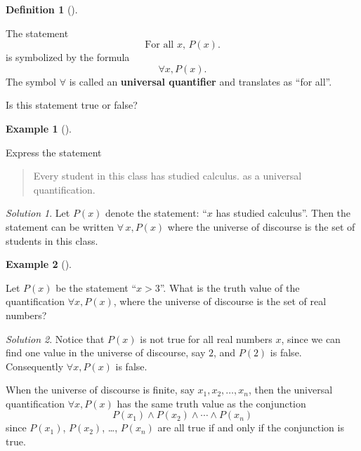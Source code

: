 \documentclass[
  letterpaper,
  10pt,
  reqno,
  twopage,
  openany]{book}
\theoremstyle{plain}
\theoremstyle{definition}
\theoremstyle{definition}
\newtheorem{definition}{Definition}[chapter]
\theoremstyle{definition}
\newtheorem{example}{Example}[chapter]
\theoremstyle{plain}
\theoremstyle{plain}
\theoremstyle{remark}
\newtheorem*{solution}{Solution}
\begin{document}
\leavevmode{}%
\begin{definition}[]\label{def-universal-quantifier}

\label{uqdef} The statement \[
\text{For all $x$, $P(x)$.}
\] is symbolized by the formula \[
\forall x, P(x).
\] The symbol \(\forall\) is called an 
\textbf{universal quantifier} and translates as ``for all''.

\end{definition}

Is this statement true or false?

\leavevmode{}%
\begin{example}[]\label{exm-us}

Express the statement

\begin{quote}
Every student in this class has studied calculus. as a universal
quantification.
\end{quote}

\end{example}

\begin{solution}

Let \(P(x)\) denote the statement: ``\(x\) has studied calculus''. Then
the statement can be written \(\forall \, x, P(x)\) where the universe
of discourse is the set of students in this class.

\end{solution}

\leavevmode{}%
\begin{example}[]\label{exm-ud-1}

Let \(P(x)\) be the statement ``\(x>3\)''. What is the truth value of
the quantification \(\forall x, P(x)\), where the universe of discourse
is the set of real numbers?

\end{example}

\begin{solution}

Notice that \(P(x)\) is not true for all real numbers \(x\), since we
can find one value in the universe of discourse, say \(2\), and \(P(2)\)
is false. Consequently \(\forall x, P(x)\) is false.

\end{solution}

When the universe of discourse is finite, say \(x_1, x_2, \ldots, x_n\),
then the universal quantification \(\forall x, P(x)\) has the same truth
value as the conjunction \begin{equation}
P(x_1)\land P(x_2) \land \cdots \land P(x_n)
\end{equation} since \(P(x_1)\), \(P(x_2)\), \ldots, \(P(x_n)\) are all
true if and only if the conjunction is true.
\end{document}
